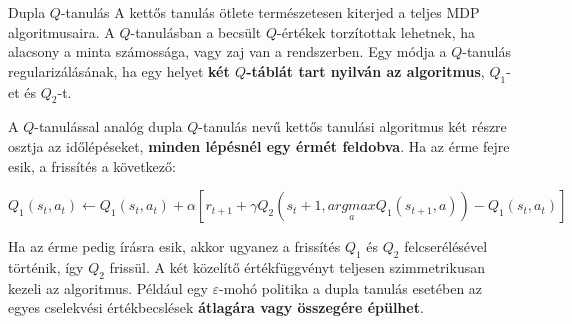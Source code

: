 \documentclass[english, aspectratio=169]{beamer}
\begin{document}
\begin{frame}{Dupla $Q$-tanulás}
A kettős tanulás ötlete természetesen kiterjed a teljes MDP algoritmusaira. A $Q$-tanulásban a becsült $Q$-értékek torzítottak lehetnek, ha alacsony a minta számossága, vagy zaj van a rendszerben. Egy módja a $Q$-tanulás regularizálásának, ha egy helyet\textbf{ két $Q$-táblát tart nyilván az algoritmus}, $Q_1$-et és $Q_2$-t.\par\smallskip
A $Q$-tanulással analóg dupla $Q$-tanulás nevű kettős tanulási algoritmus két részre osztja az időlépéseket, \textbf{minden lépésnél egy érmét feldobva}. Ha az érme fejre esik, a frissítés a következő:
\begin{block}{}
\vspace{-0.5cm}
\[
Q_1(s_t,a_t) \leftarrow Q_1(s_t,a_t) + \alpha \left[ r_{t+1} + \gamma Q_2(s_t+1, \underset{a}{argmax} Q_1(s_{t+1},a)) - Q_1(s_t, a_t) \right]
\]
\end{block}
Ha az érme pedig írásra esik, akkor ugyanez a frissítés $Q_1$ és $Q_2$ felcserélésével történik, így $Q_2$ frissül. A két közelítő értékfüggvényt teljesen szimmetrikusan kezeli az algoritmus. Például egy $\varepsilon$-mohó politika a dupla tanulás esetében az egyes cselekvési értékbecslések \textbf{átlagára vagy összegére épülhet}.
\end{frame}
\end{document}
